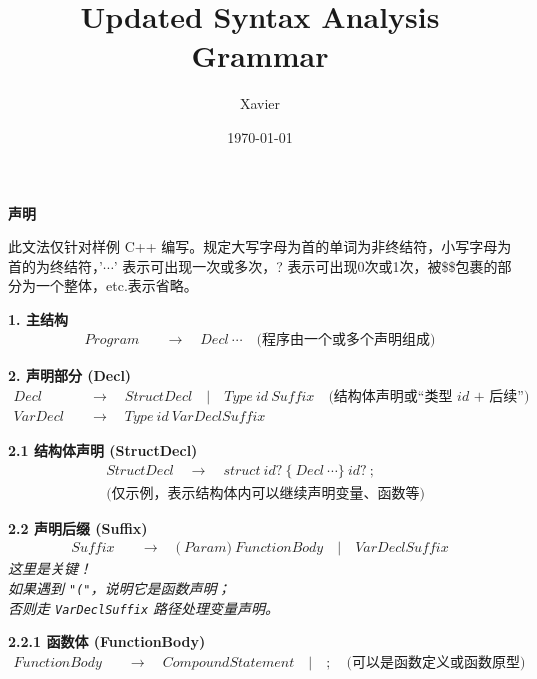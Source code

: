 \documentclass[11pt]{article}
\author{Xavier}
\date{\today}
\title{Updated Syntax Analysis Grammar}
\begin{document}
    \begin{titlepage}
        \maketitle
        \centering
        \vspace*{\fill}
        {\Large \textbf{\LARGE 声明} \\[1.5cm]
        \parbox{1\textwidth}{此文法仅针对样例 C++ 编写。规定大写字母为首的单词为非终结符，小写字母为首的为终结符，'$\cdots$' 表示可出现一次或多次，? 表示可出现0次或1次，被\$\$包裹的部分为一个整体，etc.表示省略。}
        }
        \vspace{3cm}
    \end{titlepage}

    \centering
    \textbf{1. 主结构}
    \begin{align*}
        Program &\quad \to\quad Decl\ \cdots
        \quad\textit{(程序由一个或多个声明组成)}
    \end{align*}

    \textbf{2. 声明部分 (Decl)}
    \begin{align*}
        Decl &\quad \to\quad StructDecl \quad |\quad Type\ id\ Suffix
        \quad\textit{(结构体声明或“类型 id + 后续”)} \\
        VarDecl &\quad \to\quad Type\ id\ VarDeclSuffix
    \end{align*}

    \textbf{2.1 结构体声明 (StructDecl)}
    \begin{align*}
        &StructDecl \quad \to\quad struct\ id?\ \{\ Decl\ \cdots \}\ id?\ ;\\
        &\textit{(仅示例，表示结构体内可以继续声明变量、函数等)}
    \end{align*}

    \textbf{2.2 声明后缀 (Suffix)}
    \begin{align*}
        Suffix &\quad \to\quad \bigl(\ Param \bigr)\ FunctionBody 
        \quad |\quad VarDeclSuffix
    \end{align*}
    \textit{%
        这里是关键！\\
        如果遇到 \texttt{"("}，说明它是函数声明；\\
        否则走 \texttt{VarDeclSuffix} 路径处理变量声明。%
    }
    \par 
    \vspace{3em}
    \textbf{2.2.1 函数体 (FunctionBody)}
    \begin{align*}
        FunctionBody &\quad \to\quad CompoundStatement
        \quad|\quad ;
        \quad\textit{(可以是函数定义或函数原型)}
    \end{align*}
\end{document}
